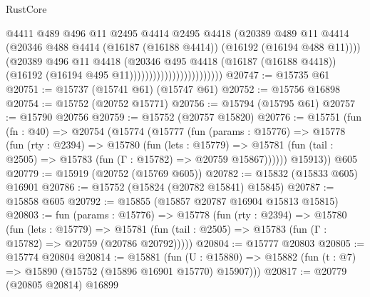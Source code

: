 \begin{lexlean}{RustCore}
\begin{coremodule}
                                            @4411
                                            @489
                                            @496
                                            @11
                                            @2495
                                            @4414
                                            @2495
                                            @4418
                                            (@20389
                                              @489
                                              @11
                                              @4414
                                              (@20346
                                                @488
                                                @4414
                                                (@16187 (@16188 @4414))
                                                (@16192 (@16194 @488 @11))))
                                            (@20389
                                              @496
                                              @11
                                              @4418
                                              (@20346
                                                @495
                                                @4418
                                                (@16187 (@16188 @4418))
                                                (@16192 (@16194 @495 @11))))))))))))))))))))))))
@20747 := @15735 @61
@20751 := @15737 (@15741 @61) (@15747 @61)
@20752 := @15756 @16898
@20754 := @15752 (@20752 @15771)
@20756 := @15794 (@15795 @61)
@20757 := @15790 @20756
@20759 := @15752 (@20757 @15820)
@20776 := @15751
    (fun (fn : @40) =>
    @20754
      (@15774
        (@15777
          (fun (params : @15776) =>
          @15778
            (fun (rty : @2394) =>
            @15780
              (fun (lets : @15779) =>
              @15781 (fun (tail : @2505) => @15783 (fun (Γ : @15782) => @20759 @15867))))))
        @15913))
    @605
@20779 := @15919 (@20752 (@15769 @605))
@20782 := @15832 (@15833 @605) @16901
@20786 := @15752 (@15824 (@20782 @15841) @15845)
@20787 := @15858 @605
@20792 := @15855 (@15857 @20787 @16904 @15813 @15815)
@20803 := fun (params : @15776) =>
  @15778
    (fun (rty : @2394) =>
    @15780
      (fun (lets : @15779) =>
      @15781 (fun (tail : @2505) => @15783 (fun (Γ : @15782) => @20759 (@20786 @20792)))))
@20804 := @15777 @20803
@20805 := @15774 @20804
@20814 := @15881
    (fun (U : @15880) => @15882 (fun (t : @7) => @15890 (@15752 (@15896 @16901 @15770) @15907)))
@20817 := @20779 (@20805 @20814) @16899

\end{coremodule}
\end{lexlean}

